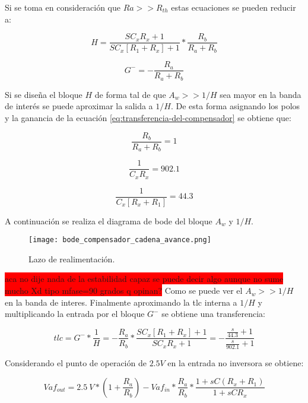 Si se toma en consideración que $Ra>>R_{th}$ estas ecuaciones se pueden reducir a: 

\begin{equation} 
	H = \frac{SC_xR_x+1}{SC_x[R_1+R_x]+1} * \frac{R_b}{R_a + R_b}
\end{equation}

\begin{equation} 
	G^- =- \frac{R_a}{R_a + R_b}
\end{equation} 
  
Si se diseña el bloque $H$ de forma tal de que $A_w>>1/H$ sea mayor en la banda de interés se puede aproximar la salida a $1/H$. De esta forma  asignando los polos y la ganancia de la ecuación \ref{eq:transferencia-del-compensador} se obtiene que:

\begin{equation} 
	\frac{R_b}{R_a+R_b}= 1 
\end{equation}

\begin{equation} 
	\frac{1}{C_x R_x} =  902.1
\end{equation} 

\begin{equation} 
	\frac{1}{C_x [R_x + R_1]} = 44.3
\end{equation} 

A continuación se realiza el diagrama de bode del bloque $A_w$ y $1/H$.
 
\begin{figure}[H]
	\centering
	\texttt{[image: bode\_compensador\_cadena\_avance.png]}
	\caption{Lazo de realimentación.}
	\label{fig:bode_compensador_cadena_avance}
\end{figure}
\colorbox{red}{aca no dije nada de la estabilidad capaz se puede decir algo aunque no sume mucho Xd tipo mfase=90 grados q opinan?}
Como se puede ver el $A_w >> 1/H$ en la banda de interes. Finalmente aproximando la tlc interna a $1/H$ y multiplicando la entrada por el bloque $G^-$ se obtiene una transferencia:

\begin{equation} 
	tlc = G^- * \frac{1}{H}  =- \frac{R_a}{R_b} * \frac{SC_x[R_1+R_x]+1}{SC_xR_x+1}=-\frac{\frac{s}{44.3}+1}{\frac{s}{902.1}+1}
\end{equation}
 

Considerando el punto de operación de $2.5V$ en la entrada no inversora se obtiene:

\begin{equation} 
	Vaf_{out}= 2.5\:V* (1+\frac{R_a}{R_b})- Vaf_{in}*\frac{R_a}{R_b}*\frac{1+sC(R_x+R_1)}{1+sCR_x}
\end{equation}

